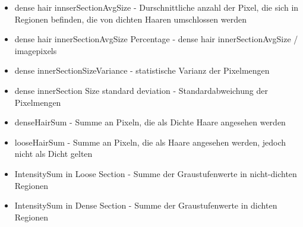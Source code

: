 \documentclass[german,a4paper, 12pt]{llncs}
\begin{document}
\begin{itemize}
	\item dense hair innserSectionAvgSize - Durschnittliche anzahl der Pixel, die sich in Regionen befinden, die von dichten Haaren umschlossen werden
	\item dense hair innerSectionAvgSize Percentage - dense hair innerSectionAvgSize / imagepixels
	\item dense innerSectionSizeVariance - statistische Varianz der Pixelmengen
	\item dense innerSection Size standard deviation - Standardabweichung der Pixelmengen
	\item denseHairSum - Summe an Pixeln, die als Dichte Haare angesehen werden
	\item looseHairSum - Summe an Pixeln, die als Haare angesehen werden, jedoch nicht als Dicht gelten
	\item IntensitySum in Loose Section - Summe der Graustufenwerte in nicht-dichten Regionen
	\item IntensitySum in Dense Section - Summe der Graustufenwerte in dichten Regionen
\end{itemize}
\end{document}
